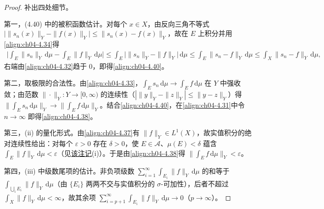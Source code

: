 \documentclass[../../main.tex]{subfiles}%
\begin{document}
\begin{proof}
补出四处细节。

第一，(4.40) 中的被积函数估计。对每个 $x\in X$，由反向三角不等式 $\big|\|s_n(x)\|_Y-\|f(x)\|_Y\big|\leqslant\|s_n(x)-f(x)\|_Y$，故在 $E$ 上积分并用\eqref{align:ch04-4.34}得
\begin{align*}
\Big|\int_E\|s_n\|_Y\,\mathrm{d}\mu-\int_E\|f\|_Y\,\mathrm{d}\mu\Big|\leqslant\int_E\big|\|s_n\|_Y-\|f\|_Y\big|\,\mathrm{d}\mu\leqslant\int_E\|s_n-f\|_Y\,\mathrm{d}\mu\leqslant\int_X\|s_n-f\|_Y\,\mathrm{d}\mu,
\end{align*}
右端由\eqref{align:ch04-4.32}趋于 $0$，即得\eqref{align:ch04-4.40}。

第二，取极限的合法性。由\eqref{align:ch04-4.33}，$\int_E s_n\,\mathrm{d}\mu\to\int_E f\,\mathrm{d}\mu$ 在 $Y$ 中强收敛；由范数 $\|\cdot\|_Y:Y\to[0,\infty)$ 的连续性（$|\|y\|_Y-\|z\|_Y|\leqslant\|y-z\|_Y$）得 $\|\int_E s_n\,\mathrm{d}\mu\|_Y\to\|\int_E f\,\mathrm{d}\mu\|_Y$。结合\eqref{align:ch04-4.40}，在\eqref{align:ch04-4.31}中令 $n\to\infty$ 即得\eqref{align:ch04-4.38}。

第三，(ii) 的量化形式。由\eqref{align:ch04-4.37}有 $\|f\|_Y\in L^1(X)$，故实值积分的绝对连续性给出：对每个 $\varepsilon>0$ 存在 $\delta>0$，使 $E\in\mathcal{A}$、$\mu(E)<\delta$ 蕴含 $\int_E\|f\|_Y\,\mathrm{d}\mu<\varepsilon$（见\hyperref[remark:ch02-绝对连续]{该注记}(i)）。于是由\eqref{align:ch04-4.38}得 $\|\int_E f\,\mathrm{d}\mu\|_Y<\varepsilon$。

第四，(iii) 中级数尾项的估计。非负项级数 $\sum_{i=1}^\infty\int_{E_i}\|f\|_Y\,\mathrm{d}\mu$ 的和等于 $\int_{\bigcup_iE_i}\|f\|_Y\,\mathrm{d}\mu$（由 $\{E_i\}$ 两两不交与实值积分的 $\sigma$-可加性），后者不超过 $\int_X\|f\|_Y\,\mathrm{d}\mu<\infty$，故其余项 $\sum_{i=p+1}^\infty\int_{E_i}\|f\|_Y\,\mathrm{d}\mu\to0$（$p\to\infty$）。
\end{proof}
\end{document}
